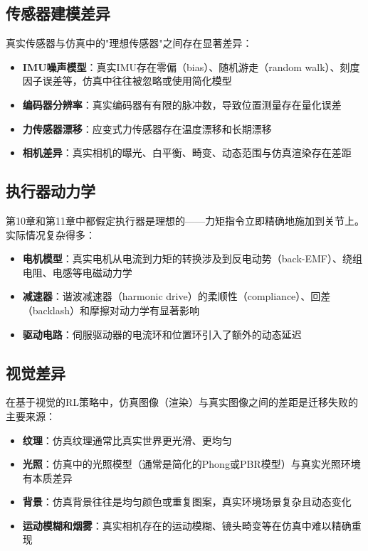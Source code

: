 \subsection{传感器建模差异}

真实传感器与仿真中的"理想传感器"之间存在显著差异：

\begin{itemize}
    \item \textbf{IMU噪声模型}：真实IMU存在零偏（bias）、随机游走（random walk）、刻度因子误差等，仿真中往往被忽略或使用简化模型
    \item \textbf{编码器分辨率}：真实编码器有有限的脉冲数，导致位置测量存在量化误差
    \item \textbf{力传感器漂移}：应变式力传感器存在温度漂移和长期漂移
    \item \textbf{相机差异}：真实相机的曝光、白平衡、畸变、动态范围与仿真渲染存在差距
\end{itemize}

\subsection{执行器动力学}

第10章和第11章中都假定执行器是理想的——力矩指令立即精确地施加到关节上。实际情况复杂得多：

\begin{itemize}
    \item \textbf{电机模型}：真实电机从电流到力矩的转换涉及到反电动势（back-EMF）、绕组电阻、电感等电磁动力学
    \item \textbf{减速器}：谐波减速器（harmonic drive）的柔顺性（compliance）、回差（backlash）和摩擦对动力学有显著影响
    \item \textbf{驱动电路}：伺服驱动器的电流环和位置环引入了额外的动态延迟
\end{itemize}

\subsection{视觉差异}

在基于视觉的RL策略中，仿真图像（渲染）与真实图像之间的差距是迁移失败的主要来源：

\begin{itemize}
    \item \textbf{纹理}：仿真纹理通常比真实世界更光滑、更均匀
    \item \textbf{光照}：仿真中的光照模型（通常是简化的Phong或PBR模型）与真实光照环境有本质差异
    \item \textbf{背景}：仿真背景往往是均匀颜色或重复图案，真实环境场景复杂且动态变化
    \item \textbf{运动模糊和烟雾}：真实相机存在的运动模糊、镜头畸变等在仿真中难以精确重现
\end{itemize}

